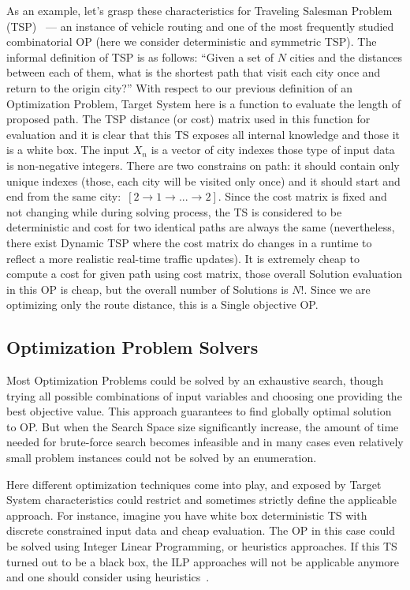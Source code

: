 As an example, let's grasp these characteristics for Traveling Salesman Problem (TSP)~\cite{applegate2006traveling} — an instance of vehicle routing and one of the most frequently studied combinatorial OP (here we consider deterministic and symmetric TSP).
The informal definition of TSP is as follows: ``Given a set of $N$ cities and the distances between each of them, what is the shortest path that visit each city once and return to the origin city?''
With respect to our previous definition of an Optimization Problem, Target System here is a function to evaluate the length of proposed path. The TSP distance (or cost) matrix used in this function for evaluation and it is clear that this TS exposes all internal knowledge and those it is a white box.
The input $X_n$ is a vector of city indexes those type of input data is non-negative integers. There are two constrains on path: it should contain only unique indexes (those, each city will be visited only once) and it should start and end from the same city:~$[2 \rightarrow 1 \rightarrow ... \rightarrow 2]$.
Since the cost matrix is fixed and not changing while during solving process, the TS is considered to be deterministic and cost for two identical paths are always the same (nevertheless, there exist Dynamic TSP where the cost matrix do changes in a runtime to reflect a more realistic real-time traffic updates\cite{cheong2011dynamic}).
It is extremely cheap to compute a cost for given path using cost matrix, those overall Solution evaluation in this OP is cheap, but the overall number of Solutions is $N!$. Since we are optimizing only the route distance, this is a Single objective OP.


\subsection{Optimization Problem Solvers}\label{BG: subsection OP Solvers}
Most Optimization Problems could be solved by an exhaustive search, though trying all possible combinations of input variables and choosing one providing the best objective value. This approach guarantees to find globally optimal solution to OP. But when the Search Space size significantly increase, the amount of time needed for brute-force search becomes infeasible and in many cases even relatively small problem instances could not be solved by an enumeration.


Here different optimization techniques come into play, and exposed by Target System characteristics could restrict and sometimes strictly define the applicable approach.
For instance, imagine you have white box deterministic TS with discrete constrained input data and cheap evaluation. The OP in this case could be solved using Integer Linear Programming, or heuristics approaches. If this TS turned out to be a black box, the ILP approaches will not be applicable anymore and one should consider using heuristics~\cite{biegler2004retrospective}.

